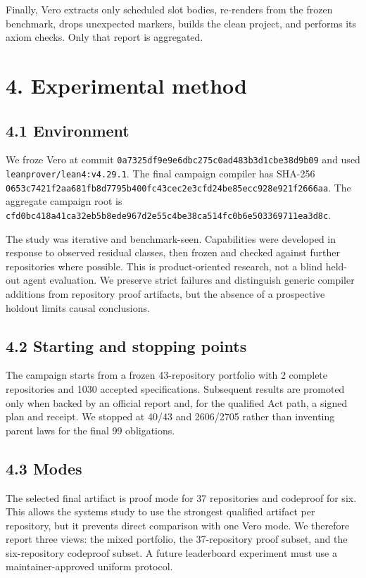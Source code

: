 \documentclass[
  10pt,
]{article}
\begin{document}
Finally, Vero extracts only scheduled slot bodies, re-renders from the
frozen benchmark, drops unexpected markers, builds the clean project,
and performs its axiom checks. Only that report is aggregated.

\section{4. Experimental method}\label{experimental-method}

\subsection{4.1 Environment}\label{environment}

We froze Vero at commit
\texttt{0a7325df9e9e6dbc275c0ad483b3d1cbe38d9b09} and used
\texttt{leanprover/lean4:v4.29.1}. The final campaign compiler has
SHA-256
\texttt{0653c7421f2aa681fb8d7795b400fc43cec2e3cfd24be85ecc928e921f2666aa}.
The aggregate campaign root is
\texttt{cfd0bc418a41ca32eb5b8ede967d2e55c4be38ca514fc0b6e503369711ea3d8c}.

The study was iterative and benchmark-seen. Capabilities were developed
in response to observed residual classes, then frozen and checked
against further repositories where possible. This is product-oriented
research, not a blind held-out agent evaluation. We preserve strict
failures and distinguish generic compiler additions from repository
proof artifacts, but the absence of a prospective holdout limits causal
conclusions.

\subsection{4.2 Starting and stopping
points}\label{starting-and-stopping-points}

The campaign starts from a frozen 43-repository portfolio with 2
complete repositories and 1030 accepted specifications. Subsequent
results are promoted only when backed by an official report and, for the
qualified Act path, a signed plan and receipt. We stopped at 40/43 and
2606/2705 rather than inventing parent laws for the final 99
obligations.

\subsection{4.3 Modes}\label{modes}

The selected final artifact is proof mode for 37 repositories and
codeproof for six. This allows the systems study to use the strongest
qualified artifact per repository, but it prevents direct comparison
with one Vero mode. We therefore report three views: the mixed
portfolio, the 37-repository proof subset, and the six-repository
codeproof subset. A future leaderboard experiment must use a
maintainer-approved uniform protocol.
\end{document}
